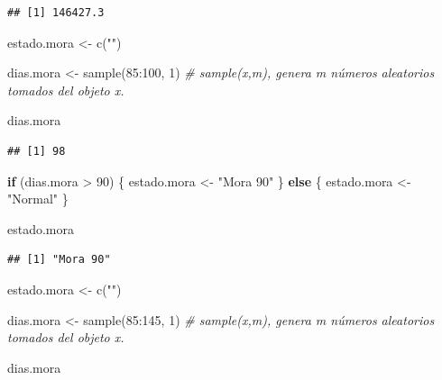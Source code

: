 \documentclass[
  12pt,
]{book}
\newenvironment{Shaded}{\begin{snugshade}}{\end{snugshade}}
\newcommand{\CommentTok}[1]{\textcolor[rgb]{0.56,0.35,0.01}{\textit{#1}}}
\newcommand{\ControlFlowTok}[1]{\textcolor[rgb]{0.13,0.29,0.53}{\textbf{#1}}}
\newcommand{\DecValTok}[1]{\textcolor[rgb]{0.00,0.00,0.81}{#1}}
\newcommand{\FunctionTok}[1]{\textcolor[rgb]{0.00,0.00,0.00}{#1}}
\newcommand{\NormalTok}[1]{#1}
\newcommand{\OtherTok}[1]{\textcolor[rgb]{0.56,0.35,0.01}{#1}}
\newcommand{\SpecialCharTok}[1]{\textcolor[rgb]{0.00,0.00,0.00}{#1}}
\newcommand{\StringTok}[1]{\textcolor[rgb]{0.31,0.60,0.02}{#1}}
\begin{document}
\begin{verbatim}
## [1] 146427.3
\end{verbatim}

\begin{Shaded}
\begin{Highlighting}[]
\NormalTok{estado.mora }\OtherTok{\textless{}{-}} \FunctionTok{c}\NormalTok{(}\StringTok{""}\NormalTok{)}

\NormalTok{dias.mora }\OtherTok{\textless{}{-}} \FunctionTok{sample}\NormalTok{(}\DecValTok{85}\SpecialCharTok{:}\DecValTok{100}\NormalTok{, }\DecValTok{1}\NormalTok{) }\CommentTok{\# sample(x,m), genera m números aleatorios tomados del objeto x.}

\NormalTok{dias.mora}
\end{Highlighting}
\end{Shaded}

\begin{verbatim}
## [1] 98
\end{verbatim}

\begin{Shaded}
\begin{Highlighting}[]
\ControlFlowTok{if}\NormalTok{ (dias.mora }\SpecialCharTok{\textgreater{}} \DecValTok{90}\NormalTok{) \{}
\NormalTok{  estado.mora }\OtherTok{\textless{}{-}} \StringTok{"Mora 90"}
\NormalTok{\} }\ControlFlowTok{else}\NormalTok{ \{}
\NormalTok{  estado.mora }\OtherTok{\textless{}{-}} \StringTok{"Normal"}
\NormalTok{\}}

\NormalTok{estado.mora}
\end{Highlighting}
\end{Shaded}

\begin{verbatim}
## [1] "Mora 90"
\end{verbatim}

\begin{Shaded}
\begin{Highlighting}[]
\NormalTok{estado.mora }\OtherTok{\textless{}{-}} \FunctionTok{c}\NormalTok{(}\StringTok{""}\NormalTok{)}

\NormalTok{dias.mora }\OtherTok{\textless{}{-}} \FunctionTok{sample}\NormalTok{(}\DecValTok{85}\SpecialCharTok{:}\DecValTok{145}\NormalTok{, }\DecValTok{1}\NormalTok{) }\CommentTok{\# sample(x,m), genera m números aleatorios tomados del objeto x.}

\NormalTok{dias.mora}
\end{Highlighting}
\end{Shaded}
\end{document}
